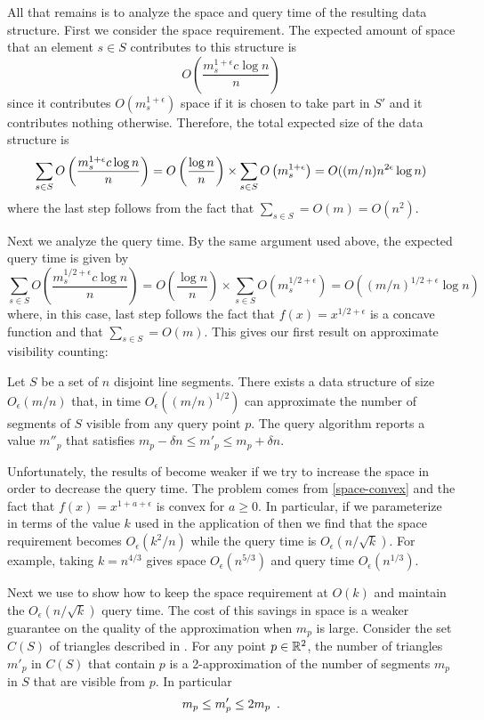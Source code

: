 \documentclass{patmorin}
\newcommand{\Oe}{O_\epsilon}
\begin{document}
All that remains is to analyze the space and query time of the resulting
data structure.  First we consider the space requirement.  The expected
amount of space that an element $s\in S$ contributes to this structure is
\[
    O\left(\frac{m_s^{1+\epsilon}c\log n}{n}\right)
\]
since it contributes $O(m_s^{1+\epsilon})$ space if it is chosen to take
part in $S'$ and it contributes nothing otherwise.  Therefore, the total
expected size of the data structure is
\begin{equation}
    \sum_{s\in S}O\left(\frac{m_s^{1+\epsilon}c\log n}{n}\right)
     = O\left(\frac{\log n}{n}\right)
         \times\sum_{s\in S}O\left(m_s^{1+\epsilon}\right)
     = O((m/n)n^{2\epsilon}\log n) \eqlabel{space-convex}
\end{equation}
where the last step follows from the fact that $\sum_{s\in S} = O(m) = O(n^2)$.

Next we analyze the query time. By the same argument used above, the
expected query time is given by 
\[
    \sum_{s\in S}O\left(\frac{m_s^{1/2+\epsilon}c\log n}{n}\right)
     = O\left(\frac{\log n}{n}\right)
         \times\sum_{s\in S}O\left(m_s^{1/2+\epsilon}\right)
     = O((m/n)^{1/2+\epsilon}\log n)
\]
where, in this case, last step follows the fact that
$f(x)=x^{1/2+\epsilon}$ is a concave function and that $\sum_{s\in S}
= O(m)$.  This gives our first result on approximate visibility counting:

\begin{thm}
Let $S$ be a set of $n$ disjoint line segments.  There exists a
data structure of size $\Oe(m/n)$ that, in time $\Oe((m/n)^{1/2})$
can approximate the number of segments of $S$ visible from any query
point $p$.  The query algorithm reports a value $m''_p$ that satisfies
$m_p-\delta n \le m'_p \le m_p+\delta n$.
\end{thm}

Unfortunately, the results of  become weaker if we try
to increase the space in order to decrease the query time.  The problem
comes from \eqref{space-convex} and the fact that $f(x)=x^{1+a+\epsilon}$
is convex for $a\ge 0$.  In particular, if we parameterize in terms of
the value $k$ used in the application of  then we
find that the space requirement becomes $\Oe(k^2/n)$ while the query
time is $\Oe(n/\sqrt{k})$.  For example, taking $k=n^{4/3}$ gives space
$\Oe(n^{5/3})$ and query time $\Oe(n^{1/3})$.

Next we use  to show how to keep the space requirement
at $O(k)$ and maintain the $\Oe(n/\sqrt{k})$ query time.  The cost
of this savings in space is a weaker guarantee on the quality of the
approximation when $m_p$ is large.  Consider the set $C(S)$ of triangles
described in .  For any point $p\in\mathbb{R}^2$, the number of
triangles $m'_p$ in $C(S)$ that contain $p$ is a 2-approximation of the
number of segments $m_p$ in $S$ that are visible from $p$.  In particular
\begin{equation}
   m_p \le m'_p \le 2m_p \enspace . \eqlabel{mpmp}
\end{equation}
\end{document}
